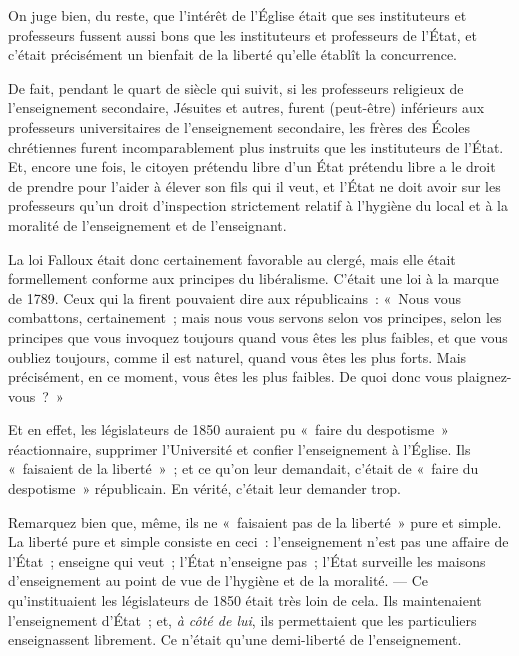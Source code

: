 \documentclass[french,twoside]{book} %
\begin{document}
On juge bien, du reste, que l’intérêt de l’Église était que ses instituteurs et professeurs fussent aussi bons que les instituteurs et professeurs de l’État, et c’était précisément un bienfait de la liberté qu’elle établît la concurrence.\par
De fait, pendant le quart de siècle qui suivit, si les professeurs religieux de l’enseignement secondaire, Jésuites et autres, furent (peut-être)  inférieurs aux professeurs universitaires de l’enseignement secondaire, les frères des Écoles chrétiennes furent incomparablement plus instruits que les instituteurs de l’État. Et, encore une fois, le citoyen prétendu libre d’un État prétendu libre a le droit de prendre pour l’aider à élever son fils qui il veut, et l’État ne doit avoir sur les professeurs qu’un droit d’inspection strictement relatif à l’hygiène du local et à la moralité de l’enseignement et de l’enseignant.\par
La loi Falloux était donc certainement favorable au clergé, mais elle était formellement conforme aux principes du libéralisme. C’était une loi à la marque de 1789. Ceux qui la firent pouvaient dire aux républicains : « Nous vous combattons, certainement ; mais nous vous servons selon vos principes, selon les principes que vous invoquez toujours quand vous êtes les plus faibles, et que vous oubliez toujours, comme il est naturel, quand vous êtes les plus forts. Mais précisément, en ce moment, vous êtes les plus faibles. De quoi donc vous plaignez-vous ? »\par
Et en effet, les législateurs de 1850 auraient pu « faire du despotisme » réactionnaire, supprimer l’Université et confier l’enseignement à l’Église. Ils « faisaient de la liberté » ; et ce qu’on leur demandait, c’était de « faire du despotisme » républicain.  En vérité, c’était leur demander trop.\par
Remarquez bien que, même, ils ne « faisaient pas de la liberté » pure et simple. La liberté pure et simple consiste en ceci : l’enseignement n’est pas une affaire de l’État ; enseigne qui veut ; l’État n’enseigne pas ; l’État surveille les maisons d’enseignement au point de vue de l’hygiène et de la moralité. — Ce qu’instituaient les législateurs de 1850 était très loin de cela. Ils maintenaient l’enseignement d’État ; et, {\itshape à côté de lui}, ils permettaient que les particuliers enseignassent librement. Ce n’était qu’une demi-liberté de l’enseignement.\par
\end{document}
